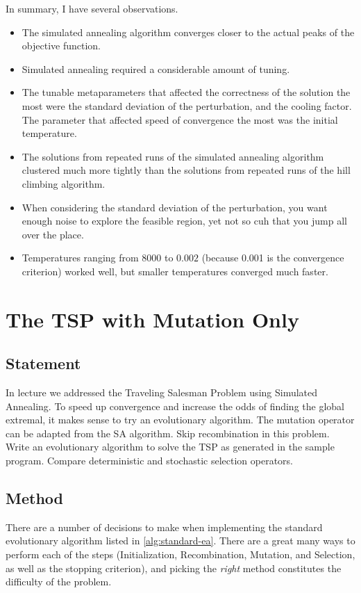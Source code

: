 \documentclass{article}
\begin{document}
In summary, I have several observations.
\begin{itemize}
    \item The simulated annealing algorithm converges closer to the actual peaks of the objective
          function.
    \item Simulated annealing required a considerable amount of tuning.
    \item The tunable metaparameters that affected the correctness of the solution the most were
          the standard deviation of the perturbation, and the cooling factor. The parameter that
          affected speed of convergence the most was the initial temperature.
    \item The solutions from repeated runs of the simulated annealing algorithm clustered much more
          tightly than the solutions from repeated runs of the hill climbing algorithm.
    \item When considering the standard deviation of the perturbation, you want enough noise to
          explore the feasible region, yet not so cuh that you jump all over the place.
    \item Temperatures ranging from $8000$ to $0.002$ (because 0.001 is the convergence criterion)
          worked well, but smaller temperatures converged much faster.
\end{itemize}

\section{The TSP with Mutation Only}\label{prob:2}

\subsection{Statement}
In lecture we addressed the Traveling Salesman Problem using Simulated Annealing. To speed up
convergence and increase the odds of finding the global extremal, it makes sense to try an
evolutionary algorithm. The mutation operator can be adapted from the SA algorithm. Skip
recombination in this problem. Write an evolutionary algorithm to solve the TSP as generated in the
sample program. Compare deterministic and stochastic selection operators.

\subsection{Method}
There are a number of decisions to make when implementing the standard evolutionary algorithm
listed in \autoref{alg:standard-ea}. There are a great many ways to perform each of the steps
(Initialization, Recombination, Mutation, and Selection, as well as the stopping criterion), and
picking the \textit{right} method constitutes the difficulty of the problem.
\end{document}
